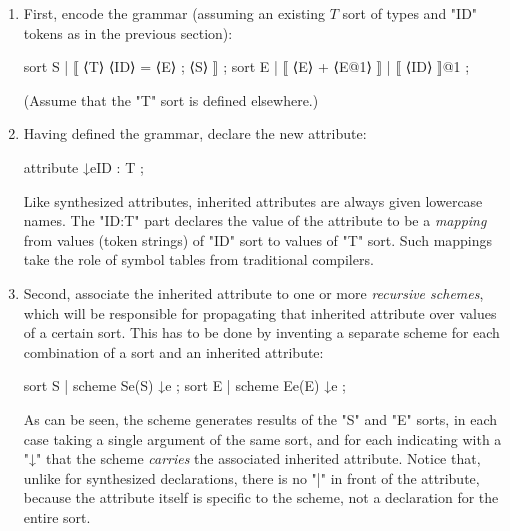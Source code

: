\documentclass[11pt]{article} %
\begin{document}
\begin{example}
\begin{enumerate}
  \item First, encode the grammar (assuming an existing $T$ sort of types and
    "ID" tokens as in the previous section):
    \begin{hacs}
   sort S  | ⟦ ⟨T⟩ ⟨ID⟩ = ⟨E⟩ ; ⟨S⟩ ⟧ ;
   sort E  | ⟦ ⟨E⟩ + ⟨E@1⟩ ⟧   | ⟦ ⟨ID⟩ ⟧@1 ;
    \end{hacs}
    (Assume that the "T" sort is defined elsewhere.)

  \item Having defined the grammar, declare the new attribute:
    \begin{hacs}
   attribute ↓e{ID : T} ;
    \end{hacs}
    Like synthesized attributes, inherited attributes are always given lowercase names.  The
    "{ID:T}" part declares the value of the attribute to be a \emph{mapping} from values (token
    strings) of "ID" sort to values of "T" sort. Such mappings take the role of symbol tables from
    traditional compilers.

  \item Second, associate the inherited attribute to one or more \emph{recursive schemes}, which
    will be responsible for propagating that inherited attribute over values of a certain sort.
    This has to be done by inventing a separate scheme for each combination of a sort and an
    inherited attribute:
    \begin{hacs}
   sort S | scheme Se(S) ↓e ;
   sort E | scheme Ee(E) ↓e ;
    \end{hacs}
    As can be seen, the scheme generates results of the "S" and "E" sorts, in each case taking a
    single argument of the same sort, and for each indicating with a "↓" that the scheme
    \emph{carries} the associated inherited attribute. Notice that, unlike for synthesized
    declarations, there is no "|" in front of the attribute, because the attribute itself is
    specific to the scheme, not a declaration for the entire sort.


\end{enumerate}
\end{example}
\end{document}
